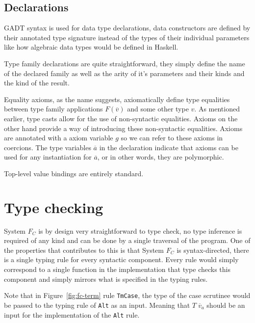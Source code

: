 \subsection{Declarations}

GADT syntax is used for data type declarations, data constructors are defined by
their annotated type signature instead of the types of their individual
parameters like how algebraic data types would be defined in Haskell.

Type family declarations are quite straightforward, they simply define the name
of the declared family as well as the arity of it's parameters and their kinds
and the kind of the result.

Equality axioms, as the name suggests, axiomatically define type equalities
between type family applications $F(\overline{v})$ and some other type $v$. As
mentioned earlier, type casts allow for the use of non-syntactic equalities.
Axioms on the other hand provide a way of introducing these non-syntactic
equalities. Axioms are annotated with a axiom variable $g$ so we can refer to
these axioms in coercions. The type variables $\overline{a}$ in the declaration
indicate that axioms can be used for any instantiation for $\overline{a}$, or in
other words, they are polymorphic.

Top-level value bindings are entirely standard.


\section{Type checking}

System $F_C$ is by design very straightforward to type check, no type inference
is required of any kind and can be done by a single traversal of the program.
One of the properties that contributes to this is that System $F_C$ is
syntax-directed, there is a single typing rule for every syntactic component.
Every rule would simply correspond to a single function in the implementation
that type checks this component and simply mirrors what is specified in the
typing rules.

Note that in Figure~\ref{fig:fc-term} rule \texttt{TmCase}, the type of the case
scrutinee would be passed to the typing rule of \texttt{Alt} as an input.
Meaning that $T \; \overline{v}_a$ should be an input for the implementation of
the \texttt{Alt} rule.

